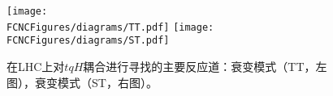 
\begin{figure}[htb]
\centering
\texttt{[image: \\FCNCFigures/diagrams/TT.pdf]}
\texttt{[image: \\FCNCFigures/diagrams/ST.pdf]}\\
\caption{在LHC上对$tqH$耦合进行寻找的主要反应道：衰变模式（TT，左图），衰变模式（ST，右图）。}
\label{fig:diagrams}
\end{figure}